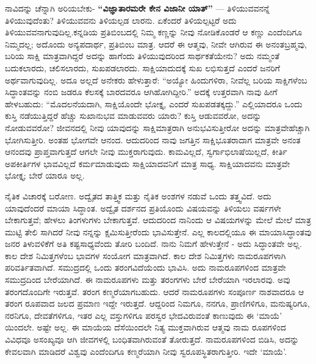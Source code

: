ನಾವಿದನ್ನು ಚೆನ್ನಾಗಿ ಅರಿಯಬೇಕು- \textbf{“ವಿಜ್ಞಾತಾರಮರೇ ಕೇನ ವಿಜಾನೀ ಯಾತ್​”} — ತಿಳಿಯುವವನನ್ನೆ ತಿಳಿಯುವುದೆಂತು? ತಿಳಿಯುವವನು ತಿಳಿಯಲ್ಪಡ ಲಾರನು. ಏಕೆಂದರೆ ತಿಳಿಯಲ್ಪಟ್ಟರೆ ಅದು ತಿಳಿಯುವವನಾಗುವುದಿಲ್ಲ.\break ಕನ್ನಡಿಯ ಪ್ರತಿಬಿಂಬದಲ್ಲಿ ನಿಮ್ಮ ಕಣ್ಣನ್ನು ನೀವು ನೋಡಿಕೊಂಡರೆ ಆ ಕಣ್ಣು ಎಂದೆಂದಿಗೂ ನಿಮ್ಮದಲ್ಲ; ಅದೊಂದು ಅನ್ಯಪದಾರ್ಥ, ಪ್ರತಿಬಿಂಬ ಮಾತ್ರ. ಆದರೆ ಈ ಆತ್ಮವು, ನೀವೇ ಆಗಿರುವ ಈ ಅನಂತಬ್ರಹ್ಮವು, ಬರಿಯ ಸಾಕ್ಷಿ ಮಾತ್ರವಾಗಿದ್ದರೆ ಅದನ್ನು ಹಾಗೆಂದು ತಿಳಿಯುವುದರಿಂದ ಸಾರ್ಥಕತೆಯೇನು? ಅದು ನಮ್ಮಂತೆ ಬದುಕಲಾರದು, ಚಲಿಸಲಾರದು, ಸುಖಪಡಲಾರದು. ಸಾಕ್ಷಿಯಾದುದಕ್ಕೆ ಸುಖ ಲಭಿಸುತ್ತದೆ ಎಂದರೆ ಜನರಿಗೆ ಅರ್ಥವಾಗುವುದಿಲ್ಲ. ಅದೂ ಅಲ್ಲದೆ ಅನೇಕರು ಹೇಳುತ್ತಾರೆ: “ಅಯ್ಯೋ ಹಿಂದುಗಳಿರಾ, ನೀವೆಲ್ಲ ಬರಿಯ ಸಾಕ್ಷಿಗಳೆಂಬ ಸಿದ್ಧಾಂತವನ್ನು ನಂಬಿ ಜಡರೂ ಕೆಲಸಕ್ಕೆ ಬಾರದವರೂ ಆಗಿಹೋಗಿದ್ದೀರಿ.” ಅದಕ್ಕೆ ಉತ್ತರವಾಗಿ ನಾವು ಹೀಗೆ ಹೇಳಬಹುದು: “ಮೊದಲನೆಯ\-ದಾಗಿ, ಸಾಕ್ಷಿಯೊಂದೇ ಭೋಕ್ತೃ, ಎಂದರೆ ಸುಖಪಡತಕ್ಕದ್ದು.” ಎಲ್ಲಿಯಾದರೂ ಒಂದು ಕುಸ್ತಿ ನಡೆಯುತ್ತಿದ್ದರೆ ಹೆಚ್ಚು ಸುಖಾನುಭವ ಮಾಡುವವರು ಯಾರು? ಕುಸ್ತಿ ಆಡುವವರೋ, ಅದನ್ನು ನೋಡುವವರೋ? ಜೀವನದಲ್ಲಿ ನೀವು\- ಯಾವುದನ್ನು ಸಾಕ್ಷಿಮಾತ್ರರಾಗಿ ಅನುಭವಿಸುತ್ತೀರೋ ಅದನ್ನು ಮಾತ್ರವೇ\break ಹೆಚ್ಚಾಗಿ ಭೋಗಿಸುತ್ತೀರಿ. ಅಂತಹ ಭೋಗವೇ ಆನಂದ. ಆದುದರಿಂದ ನಾವು ಜಗತ್ತಿನ ಸಾಕ್ಷಿಭೂತರಾದಾಗ ಮಾತ್ರವೇ ಅನಂತ ಆನಂದವು ಪ್ರಾಪ್ತವಾಗುತ್ತದೆ ಆಗಲೇ ನೀವು ಮುಕ್ತರಾಗುವುದು. ಕಾಮವಿಲ್ಲದೆ, ಸ್ವರ್ಗಾಭಿಲಾಷೆಯಿಲ್ಲದೆ, ಕೀರ್ತಿ ಅಪಕೀರ್ತಿಗಳ ಭಾವವಿಲ್ಲದೆ ಕರ್ಮಮಾಡುವುದು ಸಾಕ್ಷಿಯಾದವನಿಗೆ ಮಾತ್ರ ಸಾಧ್ಯ. ಸಾಕ್ಷಿಯಾದವನು ಮಾತ್ರವೇ ಭೋಕ್ತೃ; ಬೇರೆ ಯಾರೂ ಅಲ್ಲ.

ನೈತಿಕ ವಿಚಾರಕ್ಕೆ ಬರೋಣ. ಅದ್ವೈತದ ತಾತ್ತ್ವಿಕ ಮತ್ತು ನೈತಿಕ ಅಂಶಗಳ ನಡುವೆ ಒಂದು ತತ್ತ್ವವಿದೆ. ಅದು ಯಾವುದೆಂದರೆ ಮಾಯಾ ಸಿದ್ಧಾಂತ. ಅದ್ವೈತ ದರ್ಶನದ ಪ್ರತಿಯೊಂದು ವಿಷಯವನ್ನು ತಿಳಿಯಲು ವರ್ಷಗಳೇ ಬೇಕಾಗು\-ತ್ತವೆ; ಹೇಳಲು ತಿಂಗಳುಗಳು ಬೇಕಾಗುತ್ತವೆ. ಆದುದರಿಂದ ನಾನಿಂದು ಆ ವಿಷಯಗಳನ್ನು ಮೇಲೆ ಮೇಲೆ ಮಾತ್ರ ಮುಟ್ಟಿ ತೇಲಿ ಸಾಗಿದರೆ ನೀವು ನನ್ನನ್ನು ಕ್ಷಮಿಸುತ್ತೀರೆಂದು ಭಾವಿಸುತ್ತೇನೆ. ಎಲ್ಲ ಕಾಲದಲ್ಲಿಯೂ ಈ ಮಾಯಾಸಿದ್ಧಾಂತವು ಜನರ ತಿಳುವಳಿಕೆಗೆ ಅತಿ ಕಷ್ಟಸಾಧ್ಯವೆಂದು ತೋರಿ ಬಂದಿದೆ. ನಾನು ನಿಮಗೆ ಹೇಳುತ್ತೇನೆ - ಅದು ಸಿದ್ಧಾಂತವೇ ಅಲ್ಲ. ಕಾಲ ದೇಶ ನಿಮಿತ್ತಗಳೆಂಬ ಭಾವಗಳ ಸಂಯೋಗ ಮಾತ್ರವಾಗಿದೆ. ಕಾಲ ದೇಶ ನಿಮಿತ್ತಗಳು ನಾಮರೂಪಗಳಾಗಿ ಪರಿವರ್ತಿತವಾಗಿದೆ. ಸಮುದ್ರದಲ್ಲಿ ಒಂದು ತರಂಗವಿದೆಯೆಂದು ಭಾವಿಸಿ. ಅದು ನಾಮರೂಪಗಳಿಂದ ಮಾತ್ರವೇ ಸಮುದ್ರದಿಂದ ಬೇರೆಯಾಗಿದೆ. ಈ ನಾಮರೂಪಗಳು ಮತ್ತು ತರಂಗಗಳು ಬೇರೆ ಬೇರೆಯಾಗಿ ಇರ\-ಲಾರವು. ಅವು ತರಂಗದೊಂದಿಗೇ ಇರುತ್ತವೆ. ತರಂಗ ಕಣ್ಮರೆಯಾಗ\-ಬಹುದು. ಆದರೆ ನಾಮರೂಪಗಳು ಸಂಪೂರ್ಣ ನಾಶವಾದರೂ ಆ ತರಂಗ ರೂಪವಾದ ಜಲದ ಪ್ರಮಾಣ ಇದ್ದೇ ಇರುತ್ತದೆ. ಆದ್ದರಿಂದ ನಿಮಗೂ, ನನಗೂ, ಪ್ರಾಣಿಗಳಿಗೂ, ಮನುಷ್ಯರಿಗೂ, ನರನಿಗೂ, ದೇವತೆಗಳಿಗೂ, ಇತರ ಎಲ್ಲ ವಸ್ತುಗಳಿಗೂ ಪರಸ್ವರ ಭೇದವಿರುವಂತೆ ಕಾಣುವುದು ಈ ‘ಮಾಯೆ’ ಯಿಂದಲೇ. ಅಷ್ಟೇ ಅಲ್ಲ. ಈ ಮಾಯೆಯ ದೆಸೆಯಿಂದಲೇ ನಿತ್ಯ ಮುಕ್ತವಾಗಿರುವ ಆತ್ಮವು ನಾಮ ರೂಪಗಳಿಂದ ವಿವಿಧವೂ ಅಸಂಖ್ಯವೂ ಆಗಿ ಜೀವಗಳಲ್ಲಿ ಬಂಧಿತವಾಗಿರುವಂತೆ ತೋರುತ್ತದೆ. ನಾಮರೂಪಗಳಿಂದ ಬಿಡಿಸಿ, ಅದನ್ನು ಕೇವಲವಾಗಿ ಮಾಡಿದರೆ ವಿಶ್ವವು ಎಂದೆಂದಿಗೂ ಕಣ್ಮರೆಯಾಗಿ ನೀವು ಸ್ವರೂಪಸ್ಥಿತರಾಗುತ್ತೀರಿ. ಇದೇ ‘ಮಾಯೆ’.

